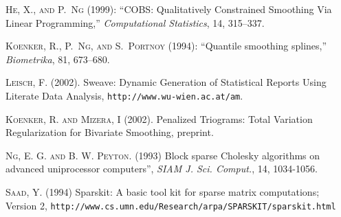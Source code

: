\documentclass{article}
\begin{document}
\textsc{He, X.,  {\small and} P.~Ng}  (1999): ``COBS: {Q}ualitatively
  Constrained Smoothing Via Linear Programming,'' \emph{Computational
  Statistics}, 14, 315--337.

\textsc{Koenker, R., P.~Ng,  {\small and} S.~Portnoy}  (1994): ``Quantile
  smoothing splines,'' \emph{Biometrika}, 81, 673--680.

\textsc{Leisch, F.} (2002). Sweave:  Dynamic Generation of Statistical Reports
Using Literate Data Analysis, \texttt{http://www.wu-wien.ac.at/am}.

\textsc{Koenker, R. {\small and} Mizera, I} (2002). Penalized Triograms:  Total
Variation Regularization for Bivariate Smoothing, preprint.

\textsc{Ng, E. G. {\small and} B. W. Peyton}. (1993) Block sparse Cholesky algorithms
on advanced uniprocessor computers'', \textit{SIAM J. Sci. Comput.}, 
14, 1034-1056.

\textsc{Saad, Y.} (1994) Sparskit: A basic tool kit for sparse matrix
computations; Version 2, 
\texttt{http://www.cs.umn.edu/Research/arpa/SPARSKIT/sparskit.html}
\end{document}
